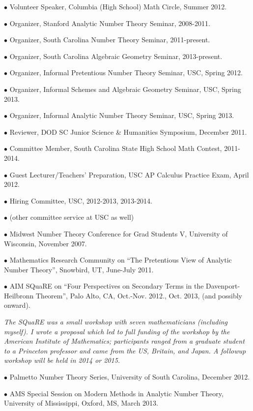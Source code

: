\documentclass{article}
\newcommand{\categorywidth}{1in}        %
\newcommand{\categorysep}{5pt}
\newcommand{\catlistlabel}[1]%
{\raisebox{0pt}[1ex][0pt]{\makebox[\labelwidth][l]%
    {\parbox[t]{\labelwidth}{\hspace{0pt}\textbf{#1}}}}}
\newenvironment{categories}{\begin{list}{}{
      \setlength{\labelwidth}{\categorywidth}
      \setlength{\leftmargin}{\labelwidth}
      \addtolength{\leftmargin}{\labelsep}
      \setlength{\topsep}{20pt}
      \setlength{\itemsep}{\categorysep}
      \renewcommand{\makelabel}{\catlistlabel}
      }}{\end{list}}
\newcommand{\category}[1]{\item[#1]}
\begin{document}
\begin{flushleft}
\begin{categories}
{$\bullet$ {Volunteer Speaker, Columbia (High School) Math Circle, Summer 2012.}

$\bullet$ Organizer, Stanford Analytic Number Theory Seminar, 2008-2011.

$\bullet$ Organizer, South Carolina Number Theory Seminar, 2011-present.

$\bullet$ Organizer, South Carolina Algebraic Geometry Seminar, 2013-present.

$\bullet$ Organizer, Informal Pretentious Number Theory Seminar, USC, Spring 2012.

$\bullet$ Organizer, Informal Schemes and Algebraic Geometry Seminar, USC, Spring 2013.

$\bullet$ Organizer, Informal Analytic Number Theory Seminar, USC, Spring 2013.

$\bullet$ Reviewer, DOD SC Junior Science \& Humanities Symposium, December 2011.

$\bullet$ Committee Member, South Carolina State High School Math Contest, 2011-2014.

$\bullet$ Guest Lecturer/Teachers' Preparation, USC AP Calculus Practice Exam, April 2012.

$\bullet$ Hiring Committee, USC, 2012-2013, 2013-2014.

$\bullet$ (other committee service at USC as well)

\category{Conferences Organized}

$\bullet$ Midwest Number Theory Conference for Grad Students V, University of Wisconsin, November 2007.

$\bullet$ Mathematics Research Community on ``The Pretentious View of Analytic Number Theory'', Snowbird, UT, June-July 2011.

$\bullet$ AIM SQuaRE on ``Four Perspectives on Secondary Terms in the Davenport-Heilbronn Theorem'', Palo Alto, CA, Oct.-Nov. 2012., Oct. 2013, (and possibly onward).

{\itshape The SQuaRE was a small workshop with seven mathematicians (including myself). I wrote a proposal which led to full funding
of the workshop by the American Institute of Mathematics; 
participants ranged from a graduate student to a Princeton professor and came from the US, Britain, and Japan. A followup workshop
will be held in 2014 or 2015.}

$\bullet$ Palmetto Number Theory Series, University of South Carolina, December 2012.

$\bullet$ AMS Special Session on Modern Methods in Analytic Number Theory, University of Mississippi, Oxford, MS, March 2013.

}
\end{categories}
\end{flushleft}
\end{document}
